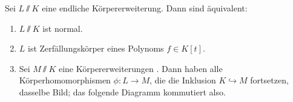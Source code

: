 \documentclass[12pt,a4paper]{scrartcl}
\begin{document}
\begin{satz}[Normalität] Sei $L\sslash K$ eine endliche Körpererweiterung. Dann sind äquivalent:
\begin{enumerate}
	\item $L\sslash K$ ist normal.
	\item $L$ ist Zerfällungskörper eines Polynoms $f\in K[t]$.
	\item Sei $M\sslash K$ eine Körpererweiterungen . Dann haben alle Körperhomomorphismen $\phi\colon L\to M$, die die Inklusion $K \hookrightarrow M$ fortsetzen, dasselbe Bild; das folgende Diagramm kommutiert also.
	\begin{figure}[h!]
		\centering
	\end{figure}
\end{enumerate}
\end{satz}
\end{document}

